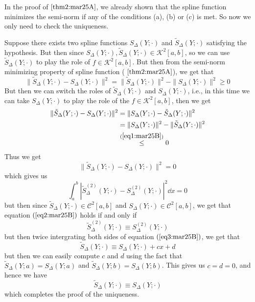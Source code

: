 \begin{prf}
    In the proof of  $\ref{thm2:mar25A}$, we already shown that the spline function minimizes the semi-norm if any of the conditions (a), (b) or (c) is met. So now we only need to check the uniqueness.

    Suppose there exists two spline functions $S_{\Delta}(Y; \cdot)$ and $\tilde{S}_{\Delta}(Y; \cdot)$ satisfying the hypothesis. But then since $S_{\Delta}(Y; \cdot), \tilde{S}_{\Delta}(Y; \cdot) \in \mathcal{K}^2[a,b]$, so we can use $\tilde{S}_{\Delta}(Y; \cdot)$ to play the role of $f \in \mathcal{K}^2[a,b]$. But then from the semi-norm minimizing property of spline function ( $\ref{thm2:mar25A}$), we get that 
    \begin{equation}\label{eq1:mar25B}
        \| \tilde{S}_{\Delta}(Y; \cdot) - S_{\Delta}(Y; \cdot) \|^2 = \| \tilde{S}_{\Delta}(Y; \cdot) \|^2 - \| S_{\Delta}(Y; \cdot) \|^2 \geq 0
    \end{equation} 
    But then we can switch the roles of $\tilde{S}_{\Delta}(Y; \cdot)$ and $S_{\Delta}(Y; \cdot)$, i.e., in this time we can take $S_{\Delta}(Y;\cdot)$ to play the role of the $f \in \mathcal{K}^2[a,b]$, then we get 
    \begin{align*}
        \| \tilde{S}_{\Delta}(Y; \cdot) - S_{\Delta}(Y; \cdot) \|^2 
        &= \| S_{\Delta}(Y; \cdot) - \tilde{S}_{\Delta}(Y; \cdot) \|^2 \\
        &= \| S_{\Delta}(Y; \cdot) \|^2 - \| \tilde{S}_{\Delta}(Y; \cdot) \|^2 \\ 
        &\overset{(\ref{eq1:mar25B})}{\leq} 0
    \end{align*}
    Thus we get 
    \[
        \| \tilde{S}_{\Delta}(Y; \cdot) - S_{\Delta}(Y; \cdot) \|^2 = 0 
    \]
    which gives us 
    \begin{equation}\label{eq2:mar25B}
        \int_a^b \left| \tilde{S}^{(2)}_{\Delta}(Y; \cdot) - S^{(2)}_{\Delta}(Y; \cdot) \right|^2\dd{x} = 0
    \end{equation}
    but then since $\tilde{S}_{\Delta}(Y;\cdot) \in \mathcal{C}^2[a,b]$ and $S_{\Delta}(Y; \cdot) \in \mathcal{C}^2[a,b]$, we get that equation $(\ref{eq2:mar25B})$ holds if and only if 
    \begin{equation}\label{eq3:mar25B}
        \tilde{S}_{\Delta}^{(2)}(Y; \cdot) \equiv S_{\Delta}^{(2)}(Y; \cdot)
    \end{equation}
    but then twice intergrating both sides of equation $(\ref{eq3:mar25B})$, we get that 
    \[
        \tilde{S}_{\Delta}(Y; \cdot) \equiv S_{\Delta}(Y; \cdot) + cx + d
    \]  
    but then we can easily compute $c$ and $d$ using the fact that $\tilde{S}_{\Delta}(Y;a) = S_{\Delta}(Y;a)$ and $\tilde{S}_{\Delta}(Y;b) = S_{\Delta}(Y;b)$. This gives us $c = d = 0$, and hence we have 
    \[
        \tilde{S}_{\Delta}(Y;\cdot) \equiv S_{\Delta}(Y;\cdot)  
    \] 
    which completes the proof of the uniqueness.
\end{prf}

